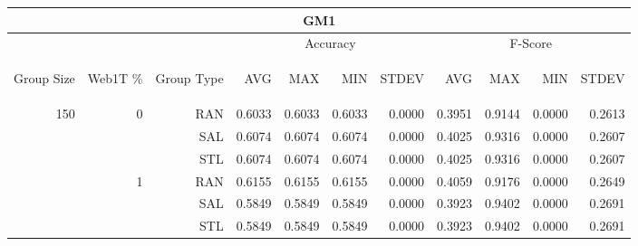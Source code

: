 \begin{center}
\begin{table}[htbp] 
 \begin{center}
\begin{tabular}{ | r | r | r | r | r | r | r | r | r | r | r |}
\hline
\multicolumn{11}{|c|}{GM1}\\
\hline
 & & & \multicolumn{4}{|c|}{Accuracy} & \multicolumn{4}{|c|}{F-Score}\\ \cline{4-11}
\begin{sideways}Group Size\end{sideways} & \begin{sideways}Web1T \%\end{sideways} & \begin{sideways}Group Type\end{sideways} & \begin{sideways}AVG\end{sideways} & \begin{sideways}MAX\end{sideways} & \begin{sideways}MIN\end{sideways} & \begin{sideways}STDEV\end{sideways} & \begin{sideways}AVG\end{sideways} & \begin{sideways}MAX\end{sideways} & \begin{sideways}MIN\end{sideways} & \begin{sideways}STDEV\end{sideways}\\
\hline
\multirow{18}{*}{150}
 & \multirow{3}{*}{0} & RAN & 0.6033 & 0.6033 & 0.6033 & 0.0000 & 0.3951 & 0.9144 & 0.0000 & 0.2613\\ \cline{3-11}
 &   & SAL & 0.6074 & 0.6074 & 0.6074 & 0.0000 & 0.4025 & 0.9316 & 0.0000 & 0.2607\\ \cline{3-11}
 &   & STL & 0.6074 & 0.6074 & 0.6074 & 0.0000 & 0.4025 & 0.9316 & 0.0000 & 0.2607\\ \cline{2-11}
 & \multirow{3}{*}{1} & RAN & 0.6155 & 0.6155 & 0.6155 & 0.0000 & 0.4059 & 0.9176 & 0.0000 & 0.2649\\ \cline{3-11}
 &   & SAL & 0.5849 & 0.5849 & 0.5849 & 0.0000 & 0.3923 & 0.9402 & 0.0000 & 0.2691\\ \cline{3-11}
 &   & STL & 0.5849 & 0.5849 & 0.5849 & 0.0000 & 0.3923 & 0.9402 & 0.0000 & 0.2691\\ \cline{2-11}

\end{tabular}
\end{center}
\end{table}
\end{center}
